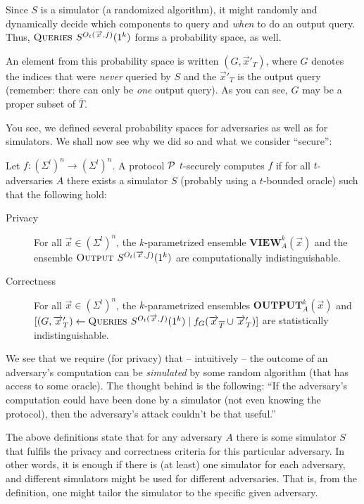 Since $S$ is a simulator (a randomized algorithm), it might randomly and dynamically decide which components to query and \emph{when} to do an output query. Thus, $\textsc{Queries } S^{O_t(\overrightarrow{x},f)}(1^k)$ forms a probability space, as well. 

An element from this probability space is written $(G,\overrightarrow{x}'_{T})$, where $G$ denotes the indices that were \emph{never} queried by $S$ and the $\overrightarrow{x}'_{T}$ is the output query (remember: there can only be \emph{one} output query). As you can see, $G$ may be a proper subset of $\overline{T}$.

You see, we defined several probability spaces for adversaries as well as for simulators. We shall now see why we did so and what we consider ``secure'':

\begin{definition}
  Let $f:(\Sigma^l)^n\rightarrow(\Sigma^l)^n$. A protocol ${\cal P}$ $t$-securely computes $f$ if for all $t$-adversaries $A$ there exists a simulator $S$ (probably using a $t$-bounded oracle) such that the following hold:
  \begin{description}
  \item[Privacy] For all $\overrightarrow{x}\in(\Sigma^l)^n$, the $k$-parametrized ensemble $\mathbf{VIEW}_A^k(\overrightarrow{x})$ and the ensemble $\textsc{Output } S^{O_t(\overrightarrow{x},f)}(1^k)$ are computationally indistinguishable.
  \item[Correctness] For all $\overrightarrow{x}\in(\Sigma^l)^n$, the $k$-parametrized ensembles $\mathbf{OUTPUT}_A^k(\overrightarrow{x})$ and $[(G,\overrightarrow{x}'_T) \leftarrow \textsc{Queries } S^{O_t(\overrightarrow{x},f)}(1^k)\mid f_G(\overrightarrow{x}_{\overline{T}}\cup\overrightarrow{x}'_T)]$ are statistically indistinguishable.
  \end{description}
\end{definition}

We see that we require (for privacy) that -- intuitively -- the outcome of an adversary's computation can be \emph{simulated} by some random algorithm (that has access to some oracle). The thought behind is the following: ``If the adversary's computation could have been done by a simulator (not even knowing the protocol), then the adversary's attack couldn't be that useful.''

The above definitions state that for any adversary $A$ there is some simulator $S$ that fulfils the privacy and correctness criteria for this particular adversary. In other words, it is enough if there is (at least) one simulator for each adversary, and different simulators might be used for different adversaries. That is, from the definition, one might tailor the simulator to the specific given adversary.

